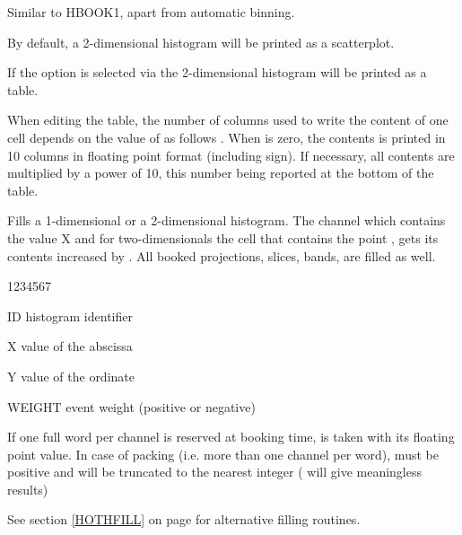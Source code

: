 \Remarks
\begin{UL}
\item Similar to HBOOK1, apart from automatic binning.
\item By default, a 2-dimensional histogram will be
      printed as a scatterplot.
\item If the option  is selected via
      the 2-dimensional histogram will be printed as a table.
\item When editing the table, the number of columns  used to
      write the content of one cell depends on the value of 
      as follows .
      When  is zero, the contents is printed in
      10 columns in floating point format (including sign). If
      necessary, all contents are multiplied by a power of 10,
      this number being reported at the bottom of the table.
\end{UL}

\label{HFILLSEC}


\Action 
Fills a 1-dimensional or a 2-dimensional histogram.
The channel which contains the value X and for two-dimensionals the cell that
contains the point , gets its contents increased by
.
All booked projections, slices, bands, are filled as well.

\Idesc
\begin{DLtt}{1234567}
\item[ID] histogram identifier
\item[X] value of the abscissa
\item[Y] value of the ordinate
\item[WEIGHT] event weight (positive or negative)
\end{DLtt}
\Remarks
\begin{UL}
\item If one full word per channel is reserved at booking time,
       is taken with its floating point value.
      In case of packing (i.e. more than one channel
      per word),  must be
      positive and will be truncated to the nearest integer
      ( will give meaningless results)
\item See section \ref{HOTHFILL} on page \pageref{HOTHFILL}
      for alternative filling routines.
\end{UL}
 
